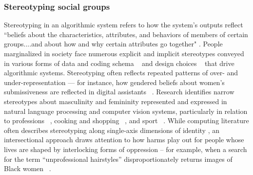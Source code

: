 \subsubsection{Stereotyping social groups} Stereotyping in an algorithmic system refers to how the system's outputs reflect ``beliefs about the characteristics, attributes, and behaviors of members of certain groups....and about how and why certain attributes go together" \cite[p. 240]{Hilton1996}. People marginalized in society face numerous explicit and implicit stereotypes conveyed in various forms of data and coding schema ~\cite{Paullada_Raji_Bender_Denton_Hanna_2021} and design choices ~\cite{Bivens_Haimson_2016} that drive algorithmic systems. Stereotyping often reflects repeated patterns of over- and under-representation — for instance, how gendered beliefs about women’s submissiveness are reflected in digital assistants ~\cite{Cambre_Kulkarni_2019, Sondergaard_Hansen_2018, Wang_2020}. Research identifies narrow stereotypes about masculinity and femininity represented and expressed in natural language processing and computer vision systems, particularly in relation to professions ~\cite{Kay_Matuszek_Munson_2015}, cooking and shopping ~\cite{Zhao_Wang_Yatskar_Ordonez_Chang_2017}, and sport ~\cite{Hendricks_Burns_Saenko_Darrell_Rohrbach_2018}. While computing literature often describes stereotyping along single-axis dimensions of identity \cite{Hendricks_Burns_Saenko_Darrell_Rohrbach_2018, Zhao_Wang_Yatskar_Ordonez_Chang_2017}, an intersectional approach draws attention to how harms play out for people whose lives are shaped by interlocking forms of oppression \cite{Buolamwini_Friedler_Wilson, Wang_Ramaswamy_Russakovsky_2022} -- for example, when a search for the term “unprofessional hairstyles” disproportionately returns images of Black women ~\cite[n.p.]{Alexander_2016}. 


